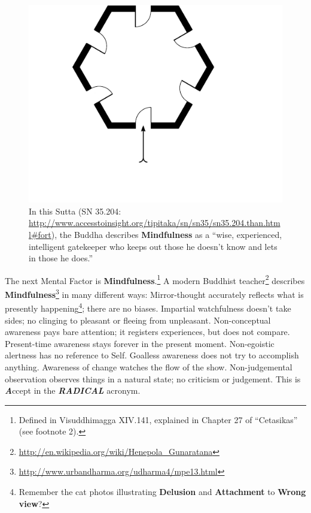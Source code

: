 \begin{figure}[H]
\centering
\includegraphics[width=1.0\linewidth]{./Diagrams/Fortress}
\caption{In this Sutta (SN 35.204: \url{http://www.accesstoinsight.org/tipitaka/sn/sn35/sn35.204.than.html\#fort}), the Buddha describes \textbf{Mindfulness} as a “wise, experienced, intelligent gatekeeper who keeps out those he doesn’t know and lets in those he does.”}
\label{fig:Fortress}
\end{figure}

The next Mental Factor is \textbf{Mindfulness}.\footnote{Defined in Visuddhimagga XIV.141, explained in Chapter 27 of “Cetasikas” (see footnote 2).} A modern Buddhist teacher\footnote{\url{http://en.wikipedia.org/wiki/Henepola_Gunaratana}} describes \textbf{Mindfulness}\footnote{\url{http://www.urbandharma.org/udharma4/mpe13.html}} in many different ways: Mirror-thought accurately reflects what is presently happening\footnote{Remember the cat photos illustrating \textbf{Delusion} and \textbf{Attachment} to \textbf{Wrong view}?}; there are no biases. Impartial watchfulness doesn’t take sides; no clinging to pleasant or fleeing from unpleasant. Non-conceptual awareness pays bare attention; it registers experiences, but does not compare. Present-time awareness stays forever in the present moment. Non-egoistic alertness has no reference to Self. Goalless awareness does not try to accomplish anything. Awareness of change watches the flow of the show. Non-judgemental observation observes things in a natural state; no criticism or judgement. This is \textbf{\textit{A}}ccept in the \textbf{\textit{RADICAL}} acronym.

